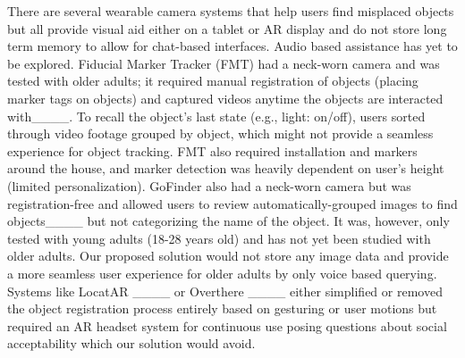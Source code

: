 There are several wearable camera systems that help users find misplaced objects but all provide visual aid either on a tablet or AR display and do not store long term memory to allow for chat-based interfaces. Audio based assistance has yet to be explored. Fiducial Marker Tracker (FMT) had a neck-worn camera and was tested with older adults; it required manual registration of objects (placing marker tags on objects) and captured videos anytime the objects are interacted with____. To recall the object's last state (e.g., light: on/off), users sorted through video footage grouped by object, which might not provide a seamless experience for object tracking. FMT also required installation and markers around the house, and marker detection was heavily dependent on user’s height (limited personalization). GoFinder also had a neck-worn camera but was registration-free and allowed users to review automatically-grouped images to find objects____ but not categorizing the name of the object. It was, however, only tested with young adults (18-28 years old) and has not yet been studied with older adults. Our proposed solution would not store any image data and provide a more seamless user experience for older adults by only voice based querying.  %
Systems like LocatAR ____ or Overthere ____ either simplified or removed the object registration process entirely based on gesturing or user motions but required an AR headset system for continuous use posing questions about social acceptability which our solution would avoid. %

